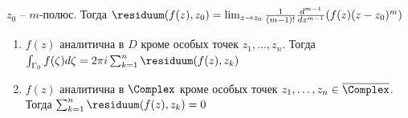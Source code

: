 \documentclass[12pt]{article}
\begin{document}
\begin{MyTheorem}
    \Ths $z_0$ -- $m$-полюс. Тогда $\residuum(f(z), z_0) = \lim_{z \to z_0} \frac{1}{(m - 1)!} \frac{d^{m - 1}}{dz^{m - 1}} (f(z) (z - z_0)^m)$
\end{MyTheorem}

\begin{MyTheorem}

    \begin{enumerate}
        \item $f(z)$ аналитична в $D$ кроме особых точек $z_1, \dots, z_n$. Тогда $\int_{\Gamma_0} f(\zeta) d\zeta = 2\pi i \sum_{k = 1}^n \residuum(f(z), z_k)$

        \item $f(z)$ аналитична в $\Complex$ кроме особых точек $z_1, \dots, z_n \in \overline{\Complex}$. Тогда $\sum_{k = 1}^n \residuum(f(z), z_k) = 0$
    \end{enumerate}
\end{MyTheorem}
\end{document}
